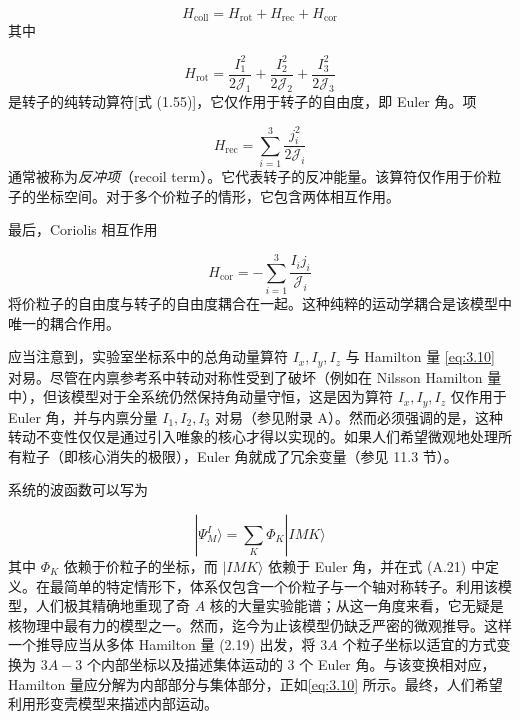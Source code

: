 \begin{equation}
H_{\text{coll}}=H_{\text{rot}}+H_{\text{rec}}+H_{\text{cor}}\label{eq:3.14}
\end{equation}
其中

\begin{equation}
H_{\text{rot}}=\frac{I^{2}_{1}}{2\mathcal{J}_{1}}+\frac{I^{2}_{2}}{2\mathcal{J}_{2}}+\frac{I^{2}_{3}}{2\mathcal{J}_{3}}\label{eq:3.15}
\end{equation}
是转子的纯转动算符{[}式 (1.55){]}，它仅作用于转子的自由度，即 Euler 角。项

\begin{equation}
H_{\text{rec}}=\sum^{3}_{i=1}\frac{j^{2}_{i}}{2\mathcal{J}_{i}}\label{eq:3.16}
\end{equation}
通常被称为\emph{反冲项}（recoil term）。它代表转子的反冲能量。该算符仅作用于价粒子的坐标空间。对于多个价粒子的情形，它包含两体相互作用。

最后，Coriolis 相互作用

\begin{equation}
H_{\text{cor}}=-\sum^{3}_{i=1}\frac{I_{i}j_{i}}{\mathcal{J}_{i}}\label{eq:3.17}
\end{equation}
将价粒子的自由度与转子的自由度耦合在一起。这种纯粹的运动学耦合是该模型中唯一的耦合作用。

应当注意到，实验室坐标系中的总角动量算符 $I_{x},I_{y},I_{z}$ 与 Hamilton 量 \ref{eq:3.10}
对易。尽管在内禀参考系中转动对称性受到了破坏（例如在 Nilsson Hamilton 量中），但该模型对于全系统仍然保持角动量守恒，这是因为算符
$I_{x},I_{y},I_{z}$ 仅作用于 Euler 角，并与内禀分量 $I_{1},I_{2},I_{3}$ 对易（参见附录
A）。然而必须强调的是，这种转动不变性仅仅是通过引入唯象的核心才得以实现的。如果人们希望微观地处理所有粒子（即核心消失的极限），Euler
角就成了冗余变量（参见 11.3 节）。

系统的波函数可以写为

\begin{equation}
|\Psi^{I}_{M}\rangle=\sum_{K}\Phi_{K}|IMK\rangle\label{eq:3.18}
\end{equation}
其中 $\Phi_{K}$ 依赖于价粒子的坐标，而 $|IMK\rangle$ 依赖于 Euler 角，并在式 (A.21) 中定义。在最简单的特定情形下，体系仅包含一个价粒子与一个轴对称转子。利用该模型，人们极其精确地重现了奇
$A$ 核的大量实验能谱；从这一角度来看，它无疑是核物理中最有力的模型之一。然而，迄今为止该模型仍缺乏严密的微观推导。这样一个推导应当从多体
Hamilton 量 (2.19) 出发，将 $3A$ 个粒子坐标以适宜的方式变换为 $3A-3$ 个内部坐标以及描述集体运动的
3 个 Euler 角。与该变换相对应，Hamilton 量应分解为内部部分与集体部分，正如\ref{eq:3.10} 所示。最终，人们希望利用形变壳模型来描述内部运动。

